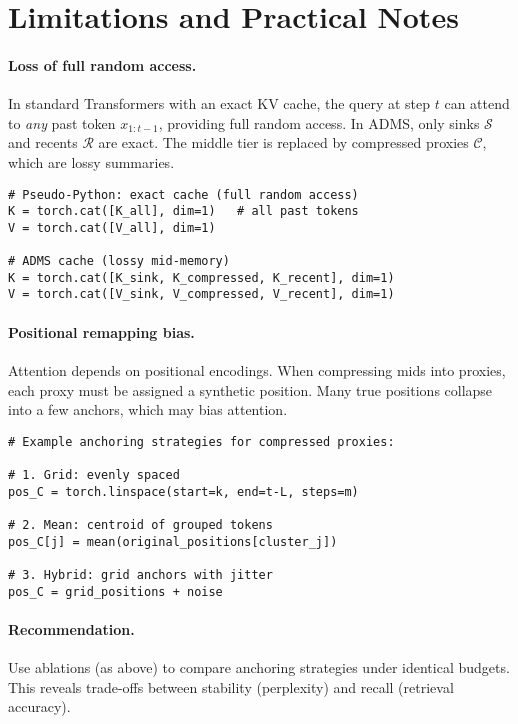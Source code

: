 \documentclass[11pt]{article}
\newcommand{\model}{\textsc{ADMS}} %
\newcommand{\kv}{KV}
\newcommand{\sink}{\mathcal{S}}
\newcommand{\recent}{\mathcal{R}}
\newcommand{\compressed}{\mathcal{C}}
\begin{document}
\section{Limitations and Practical Notes}

\paragraph{Loss of full random access.}
In standard Transformers with an exact \kv{} cache, the query at step $t$ can
attend to \emph{any} past token $x_{1:t-1}$, providing full random access.
In \model{}, only sinks $\sink$ and recents $\recent$ are exact. The middle tier
is replaced by compressed proxies $\compressed$, which are lossy summaries.

\begin{verbatim}
# Pseudo-Python: exact cache (full random access)
K = torch.cat([K_all], dim=1)   # all past tokens
V = torch.cat([V_all], dim=1)

# ADMS cache (lossy mid-memory)
K = torch.cat([K_sink, K_compressed, K_recent], dim=1)
V = torch.cat([V_sink, V_compressed, V_recent], dim=1)
\end{verbatim}

\paragraph{Positional remapping bias.}
Attention depends on positional encodings. When compressing mids into proxies,
each proxy must be assigned a synthetic position. Many true positions collapse
into a few anchors, which may bias attention.

\begin{verbatim}
# Example anchoring strategies for compressed proxies:

# 1. Grid: evenly spaced
pos_C = torch.linspace(start=k, end=t-L, steps=m)

# 2. Mean: centroid of grouped tokens
pos_C[j] = mean(original_positions[cluster_j])

# 3. Hybrid: grid anchors with jitter
pos_C = grid_positions + noise
\end{verbatim}

\paragraph{Recommendation.}
Use ablations (as above) to compare anchoring strategies under identical
budgets. This reveals trade-offs between stability (perplexity) and recall
(retrieval accuracy).
\end{document}
